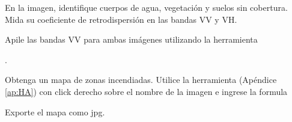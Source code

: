 \begin{que}
    En la imagen, identifique cuerpos de agua, vegetación y suelos sin cobertura. Mida su coeficiente de retrodispersión en las bandas VV y VH.
\end{que}

\begin{que}
  Apile las bandas VV para ambas imágenes utilizando la herramienta
  \begin{center}
    .      
  \end{center}
\end{que}

\begin{que}
  Obtenga un mapa de zonas incendiadas. Utilice la herramienta  (Apéndice \ref{ap:HA}) con click derecho sobre el nombre de la imagen e ingrese la formula
  \begin{center}
  \end{center}
\end{que}

\begin{que}
    Exporte el mapa como jpg.
\end{que}
